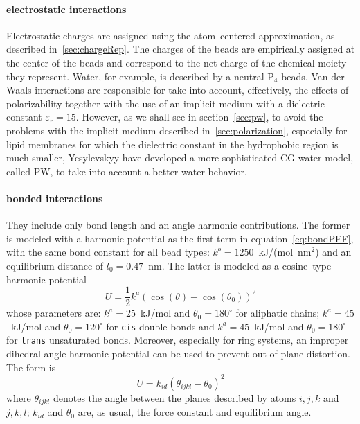 \paragraph{\textbf{electrostatic interactions}} Electrostatic charges are assigned using the atom--centered
approximation, as described in~\ref{sec:chargeRep}. The charges of the \martini{} beads are empirically assigned at
the center of the beads and correspond to the net charge of the chemical moiety they represent. Water, for
example, is described by a neutral P$_4$ beads. Van der Waals interactions are responsible for take into account,
effectively, the effects of polarizability together with the use of an implicit medium with a dielectric constant
$\varepsilon_r = 15$. However, as we shall see in section~\ref{sec:pw}, to avoid the problems with the implicit
medium described in~\ref{sec:polarization}, especially for lipid membranes for which the dielectric constant in
the hydrophobic region is much smaller, Yesylevskyy \etal{} \cite{PW} have developed a more sophisticated \ac{CG}
water model, called \ac{PW}, to take into account a better water behavior.

\paragraph{\textbf{bonded interactions}} They include only bond length and an angle harmonic contributions. The
former is modeled with a harmonic potential as the first term in equation~\eqref{eq:bondPEF}, with the same bond
constant for all bead types: $k^b = 1250$~kJ/(mol\ nm$^2$) and an equilibrium distance of $l_0 = 0.47$~nm. The
latter is modeled as a cosine--type harmonic potential
\begin{equation}
	U = \frac{1}{2}k^a (\cos(\theta) - \cos(\theta_0))^2
	\label{eq:martiniAngle}
\end{equation}
whose parameters are: $k^a = 25$~kJ/mol and $\theta_0 = 180^\circ$ for aliphatic chains; $k^a = 45$~kJ/mol and
$\theta_0 = 120^\circ$ for \texttt{cis} double bonds and $k^a = 45$~kJ/mol and $\theta_0 = 180^\circ$ for
\texttt{trans} unsaturated bonds. Moreover, especially for ring systems, an improper dihedral angle harmonic
potential can be used to prevent out of plane distortion. The form is
\begin{equation*}
	U = k_{id} (\theta_{ijkl} - \theta_0)^2
\end{equation*}
where $\theta_{ijkl}$ denotes the angle between the planes described by atoms $i,j,k$ and $j,k,l$; $k_{id}$ and
$\theta_0$ are, as usual, the force constant and equilibrium angle.

